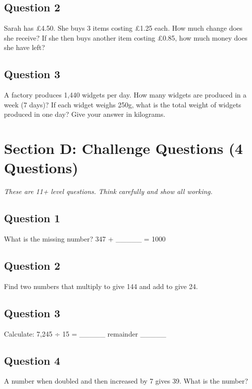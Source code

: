 \documentclass{article}
\begin{document}
\subsection*{Question 2}
Sarah has £4.50. She buys 3 items costing £1.25 each. How much change does she receive? If she then buys another item costing £0.85, how much money does she have left?

\vspace{4cm}

\subsection*{Question 3}
A factory produces 1,440 widgets per day. How many widgets are produced in a week (7 days)? If each widget weighs 250g, what is the total weight of widgets produced in one day? Give your answer in kilograms.

\vspace{4cm}

\section{Section D: Challenge Questions (4 Questions)}
\textit{These are 11+ level questions. Think carefully and show all working.}

\subsection*{Question 1}
What is the missing number? 347 + \_\_\_\_\_ = 1000

\vspace{2cm}

\subsection*{Question 2}
Find two numbers that multiply to give 144 and add to give 24.

\vspace{2cm}

\subsection*{Question 3}
Calculate: 7,245 ÷ 15 = \_\_\_\_\_ remainder \_\_\_\_\_

\vspace{2cm}

\subsection*{Question 4}
A number when doubled and then increased by 7 gives 39. What is the number?
\end{document}
